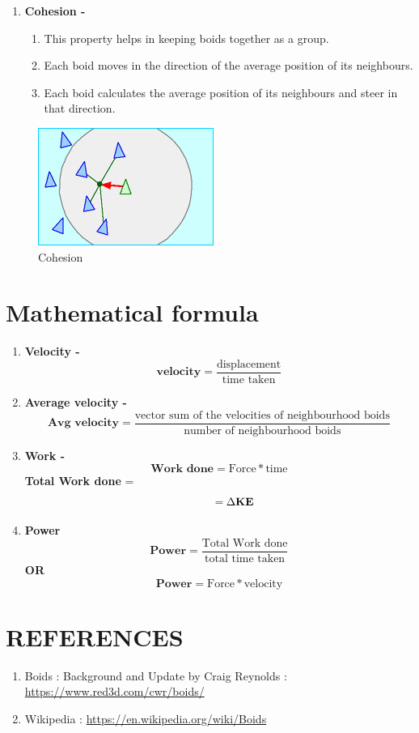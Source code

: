 \documentclass[12pt]{report}
\begin{document}
\begin{enumerate}
    \item \textbf{\large{Cohesion -}}
    \begin{enumerate}
        \item This property helps in keeping boids together as a group.
        \item Each boid moves in the direction of the average position of its neighbours.
        \item Each boid calculates the average position of its neighbours and steer in that direction.
    \end{enumerate}
\end{enumerate}

    \begin{figure}[h!]
    \centering
    \includegraphics{cohesion.jpg}
    \caption{Cohesion}
    \label{fig:Cohesion}
    \end{figure}


\section*{Mathematical formula}
\begin{enumerate}
    \item \textbf{\large{Velocity -}}
    $$
    \textbf{velocity} = \dfrac{\text{displacement}}{\text{time taken}}
    $$
    \item \textbf{\large{Average velocity -}}
    $$
    \textbf{Avg velocity} = \dfrac{\text{vector sum of the velocities of neighbourhood boids}}{\text{number of neighbourhood boids}}
    $$
    \item \textbf{\large{Work - }}
    $$
    \textbf{Work done} = \text{Force} * \text{time}
    $$\hspace{40mm}\textbf{Total Work done} = $$
    \hspace{10mm} = \Delta \textbf{KE}
    $$
    \item \textbf{\large{Power}}
    $$
    \textbf{Power} = \dfrac{\text{Total Work done}}{\text{total time taken}}
    $$\hspace{70mm} \textbf{OR}$$
    \textbf{Power} = \text{Force} * \text{velocity}
    $$
    
    
\end{enumerate}

\section*{REFERENCES}
\begin{enumerate}
    \item Boids : Background and Update by Craig Reynolds :
    \newline
    \url{https://www.red3d.com/cwr/boids/}
    \item Wikipedia : \url{https://en.wikipedia.org/wiki/Boids}
\end{enumerate}
\end{document}
